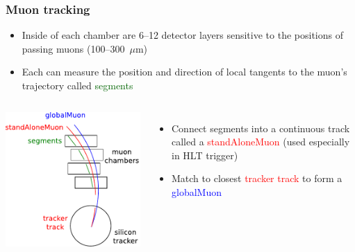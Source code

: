 \documentclass[compress]{beamer}
\begin{document}
\begin{frame}
\frametitle{Muon tracking}

\begin{itemize}
\item Inside of each chamber are 6--12 detector layers sensitive to
  the positions of passing muons (100--300~$\mu$m)
\item Each can measure the position and direction of local tangents to
  the muon's trajectory called \textcolor{darkgreen}{segments}
\end{itemize}

\vfill
\begin{columns}
\includegraphics[width=\linewidth]{pieces.pdf}
\begin{itemize}
\item Connect segments into a continuous track called a
  \textcolor{red}{standAloneMuon} (used especially in HLT trigger)
\item Match to closest \textcolor{red}{tracker track} to form a
  \textcolor{blue}{globalMuon}
\end{itemize}

\vspace{2 cm}
\end{columns}
\end{frame}
\end{document}
